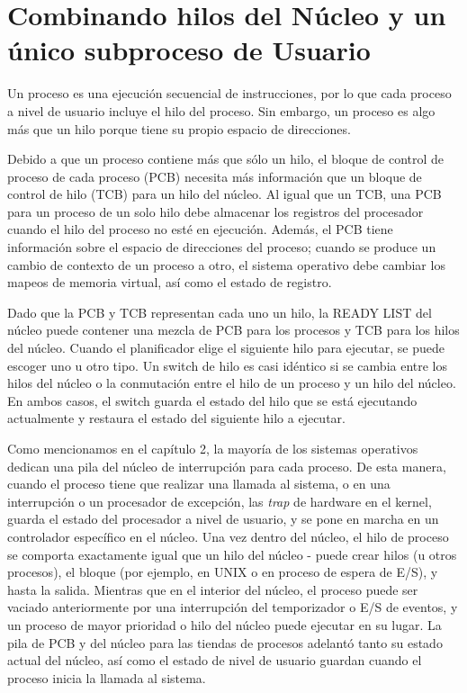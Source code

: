 \documentclass[10pt]{book}
\begin{document}
\section{Combinando hilos del Núcleo y un único subproceso de Usuario}
Un proceso es una ejecución secuencial de instrucciones, por lo que cada proceso a nivel de usuario incluye el hilo del proceso. Sin embargo, un proceso es algo más que un hilo porque tiene su propio espacio de direcciones.

Debido a que un proceso contiene más que sólo un hilo, el bloque de control de proceso de cada proceso (PCB) necesita más información que un bloque de control de hilo (TCB) para un hilo del núcleo. Al igual que un TCB, una PCB para un proceso de un solo hilo debe almacenar los registros del procesador cuando el hilo del proceso no esté en ejecución. Además, el PCB tiene información sobre el espacio de direcciones del proceso; cuando se produce un cambio de contexto de un proceso a otro, el sistema operativo debe cambiar los mapeos de memoria virtual, así como el estado de registro.

Dado que la PCB y TCB representan cada uno un hilo, la READY LIST del núcleo puede contener una mezcla de PCB para los procesos y TCB para los hilos del núcleo. Cuando el planificador elige el siguiente hilo para ejecutar, se puede escoger uno u otro tipo. Un switch de hilo es casi idéntico si se cambia entre los hilos del núcleo o la conmutación entre el hilo de un proceso y un hilo del núcleo. En ambos casos, el switch guarda el estado del hilo que se está ejecutando actualmente y restaura el estado del siguiente hilo a ejecutar.

Como mencionamos en el capítulo 2, la mayoría de los sistemas operativos dedican una pila del núcleo de interrupción para cada proceso. De esta manera, cuando el proceso tiene que realizar una llamada al sistema, o en una interrupción o un procesador de excepción, las \textit{trap} de hardware en el kernel, guarda el estado del procesador a nivel de usuario, y se pone en marcha en un controlador específico en el núcleo. Una vez dentro del núcleo, el hilo de proceso se comporta exactamente igual que un hilo del núcleo - puede crear hilos (u otros procesos), el bloque (por ejemplo, en UNIX o en proceso de espera de E/S), y hasta la salida. Mientras que en el interior del núcleo, el proceso puede ser vaciado anteriormente por una interrupción del temporizador o E/S de eventos, y un proceso de mayor prioridad o hilo del núcleo puede ejecutar en su lugar. La pila de PCB y del núcleo para las tiendas de procesos adelantó tanto su estado actual del núcleo, así como el estado de nivel de usuario guardan cuando el proceso inicia la llamada al sistema.
\end{document}
